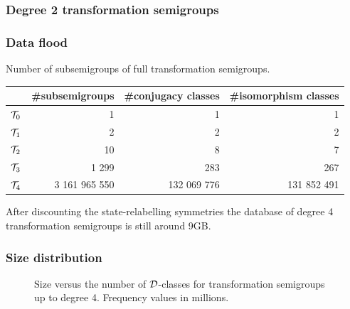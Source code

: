 \documentclass{beamer}
\newcommand{\cT}{{\cal T}}
\newcommand{\cD}{{\cal D}}
\newcommand{\gap}{\vskip10pt}
\begin{document}
\begin{frame}\frametitle{Degree 2 transformation semigroups}
\begin{center}
\scalebox{0.8}{

}
\end{center}
\end{frame}

\begin{frame}\frametitle{Data flood}

Number of subsemigroups of full transformation semigroups.

\gap
\footnotesize
\renewcommand{\arraystretch}{1}
\begin{tabular}{|c|r|r|r|}
\hline
 & \#subsemigroups & \#conjugacy classes & \#isomorphism classes \\
\hline
$\cT_0$ & 1  & 1 & 1\\
\hline
$\cT_1$ & 2  & 2 & 2\\
\hline
$\cT_2$ & 10  & 8& 7\\
\hline
$\cT_3$ & 1 299 & 283 & 267\\
\hline
$\cT_4$ & 3 161 965 550 & 132 069 776& 131 852 491\\
\hline
\end{tabular}
\normalsize
\gap
After discounting the state-relabelling symmetries the  database of degree 4 transformation semigroups is still around 9GB.
\end{frame}

\begin{frame}\frametitle{Size distribution}
  \scalebox{0.8}{}
\end{frame}

\begin{frame}
\begin{figure}
\scalebox{0.75}{

}
\caption{Size versus the number of $\cD$-classes for transformation semigroups up to degree 4. Frequency values in millions.}
\label{fig:T4SvsD}
\end{figure}
\end{frame}
\end{document}
